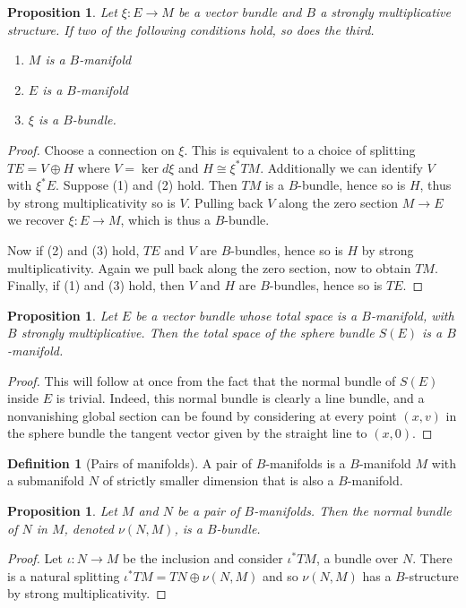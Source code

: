 \documentclass{amsart}
\newtheorem{prop}[thm]{Proposition}
\theoremstyle{definition}
\newtheorem{defi}[thm]{Definition}
\theoremstyle{remark}
\begin{document}
\begin{prop}
    Let $\xi:E\to M$ be a vector bundle and $B$ a strongly multiplicative structure. If two of the following conditions hold, so does the third.
    \begin{enumerate}
        \item $M$ is a $B$-manifold
        \item $E$ is a $B$-manifold
        \item $\xi$ is a $B$-bundle.
    \end{enumerate}
\end{prop}
\begin{proof}
    Choose a connection on $\xi$. This is equivalent to a choice of splitting $TE = V\oplus H$ where $V = \ker d\xi$ and $H\cong \xi^*TM$. Additionally we can identify $V$ with $\xi^*E$. Suppose (1) and (2) hold. Then $TM$ is a $B$-bundle, hence so is $H$, thus by strong multiplicativity so is $V$. Pulling back $V$ along the zero section $M\to E$ we recover $\xi:E\to M$, which is thus a $B$-bundle.

    Now if (2) and (3) hold, $TE$ and $V$ are $B$-bundles, hence so is $H$ by strong multiplicativity. Again we pull back along the zero section, now to obtain $TM$. Finally, if (1) and (3) hold, then $V$ and $H$ are $B$-bundles, hence so is $TE$.
\end{proof}

\begin{prop}
    \label{sphere-bundles}
    Let $E$ be a vector bundle whose total space is a $B$-manifold, with $B$ strongly multiplicative. Then the total space of the sphere bundle $S(E)$ is a $B$-manifold.
\end{prop}
\begin{proof}
    This will follow at once from the fact that the normal bundle of $S(E)$ inside $E$ is trivial. Indeed, this normal bundle is clearly a line bundle, and a nonvanishing global section can be found by considering at every point $(x,v)$ in the sphere bundle the tangent vector given by the straight line to $(x,0)$.
\end{proof}

\begin{defi}[Pairs of manifolds]
    A pair of $B$-manifolds is a $B$-manifold $M$ with a submanifold $N$ of strictly smaller dimension that is also a $B$-manifold.
\end{defi}

\begin{prop}
    Let $M$ and $N$ be a pair of $B$-manifolds. Then the normal bundle of $N$ in $M$, denoted $\nu(N,M)$, is a $B$-bundle.
\end{prop}
\begin{proof}
    Let $\iota:N\to M$ be the inclusion and consider $\iota^*TM$, a bundle over $N$. There is a natural splitting $\iota^*TM = TN\oplus \nu(N,M)$ and so $\nu(N,M)$ has a $B$-structure by strong multiplicativity.
\end{proof}
\end{document}
